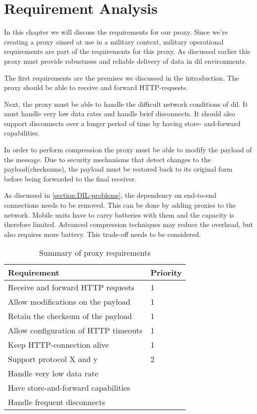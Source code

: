 \chapter{Requirement Analysis} 

In this chapter we will discuss the requirements for our proxy. Since we're
creating a proxy aimed at use in a military context, military operational
requirements are part of the requirements for this proxy. As discussed earlier
this proxy must provide robustness and reliable delivery of data in \gls{dil}
environments.

The first requirements are the premises we discussed in the introduction. The
proxy should be able to receive and forward HTTP-requests.

Next, the proxy must be able to handle the difficult network conditions of
dil. It must handle very low data rates and handle brief disconnects. It
should also support disconnects over a longer period of time by having store-
and-forward capabilities.

In order to perform compression the proxy must be able to modify the payload
of the message. Due to security mechanisms that detect changes to the
payload(checksums), the payload must be restored back to its original form
before being forwarded to the final receiver.

As discussed in \cref{section:DIL-problems}, the dependency on end-to-end
connections needs to be removed. This can be done by adding proxies to the
network. Mobile units have to carry batteries with them and the capacity is
therefore limited. Advanced compression techniques may reduce the overhead,
but also requires more battery. This trade-off needs to be considered.


\begin{table}[h]
\begin{tabular}{| l | l |}
\hline
  \textbf{Requirement} & \textbf{Priority} \\ \hline
  Receive and forward HTTP requests & 1\\ \hline
  Allow modifications on the payload & 1 \\ \hline
  Retain the checksum of the payload & 1 \\ \hline
  Allow configuration of HTTP timeouts & 1 \\ \hline
  Keep HTTP-connection alive & 1 \\ \hline
  Support protocol X and y & 2 \\ \hline
  Handle very low data rate \\ \hline
  Have store-and-forward capabilities \\ \hline
  Handle frequent disconnects\\ \hline
\end{tabular}
\caption{Summary of proxy requirements}
\end{table}


